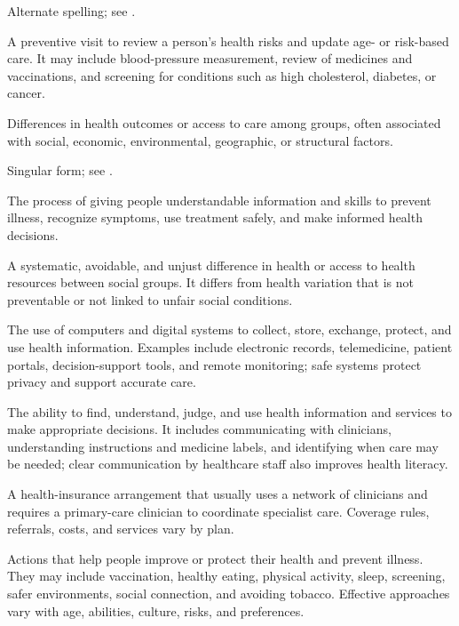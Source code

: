  Alternate spelling; see .

 A preventive visit to review a person's health risks and update age- or risk-based care. It may include blood-pressure measurement, review of medicines and vaccinations, and screening for conditions such as high cholesterol, diabetes, or cancer.

 Differences in health outcomes or access to care among groups, often associated with social,
economic, environmental, geographic, or structural factors.

 Singular form; see .

 The process of giving people understandable information and skills to prevent illness, recognize symptoms, use treatment safely, and make informed health decisions.

 A systematic, avoidable, and unjust difference in health or access to health resources
between social groups. It differs from health variation that is not preventable or not
linked to unfair social conditions.

 The use of computers and digital systems to collect, store, exchange, protect, and use health information. Examples include electronic records, telemedicine, patient portals, decision-support tools, and remote monitoring; safe systems protect privacy and support accurate care.

 The ability to find, understand, judge, and use health information and services to make appropriate decisions. It includes communicating with clinicians, understanding instructions and medicine labels, and identifying when care may be needed; clear communication by healthcare staff also improves health literacy.

 A health-insurance arrangement that usually uses a network of clinicians and requires a primary-care clinician to coordinate specialist care. Coverage rules, referrals, costs, and services vary by plan.

 Actions that help people improve or protect their health and prevent illness. They may include vaccination, healthy eating, physical activity, sleep, screening, safer environments, social connection, and avoiding tobacco. Effective approaches vary with age, abilities, culture, risks, and preferences.


